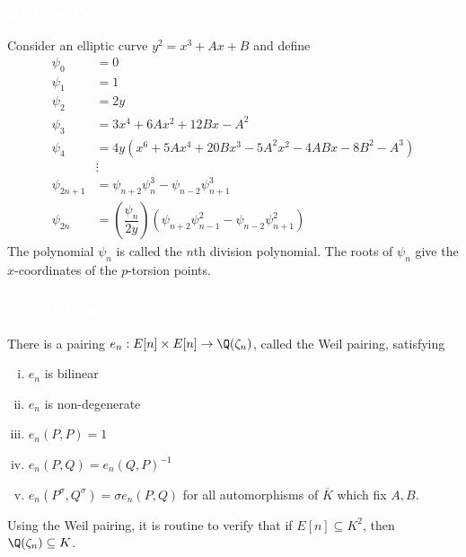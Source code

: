 \begin{frame}[plain]
\frametitle{\textcolor{white}{Division Polynomials}}
Consider an elliptic curve $y^2= x^3 + Ax + B$ and define
	\[
	\begin{aligned}
	\psi_0&= 0 \\
	\psi_1&= 1 \\
	\psi_2&= 2y \\
	\psi_3&= 3x^4 + 6Ax^2 + 12Bx - A^2 \\
	\psi_4&= 4y (x^6 + 5Ax^4 + 20Bx^3 - 5A^2x^2 - 4ABx - 8B^2 - A^3) \\
	&\vdots \\
	\psi_{2n+1}&= \psi_{n+2} \psi_n^3 - \psi_{n-2} \psi_{n+1}^3 \\
	\psi_{2n}&= \left(\dfrac{\psi_n}{2y}\right) (\psi_{n+2} \psi_{n-1}^2 - \psi_{n-2} \psi_{n+1}^2)
	\end{aligned}
	\]
The polynomial $\psi_n$ is called the $n$th division polynomial. The roots of $\psi_n$ give the $x$-coordinates of the $p$-torsion points. 
\end{frame}



\begin{frame}[plain]
\frametitle{\textcolor{white}{Weil Pairing}}
There is a pairing $e_n: E[n] \times E[n] \to \Q(\zeta_n)$, called the Weil pairing, satisfying \pspace

\begin{enumerate}[(i)]
\item $e_n$ is bilinear
\item $e_n$ is non-degenerate 
\item $e_n(P,P)= 1$
\item $e_n(P,Q)= e_n(Q,P)^{-1}$
\item $e_n(P^\sigma,Q^\sigma)= \sigma e_n(P,Q)$ for all automorphisms of $\overline{K}$ which fix $A,B$.
\end{enumerate}

\begin{rem}
Using the Weil pairing, it is routine to verify that if $E[n] \subseteq K^2$, then $\Q(\zeta_n) \subseteq K$.
\end{rem}
\end{frame}



